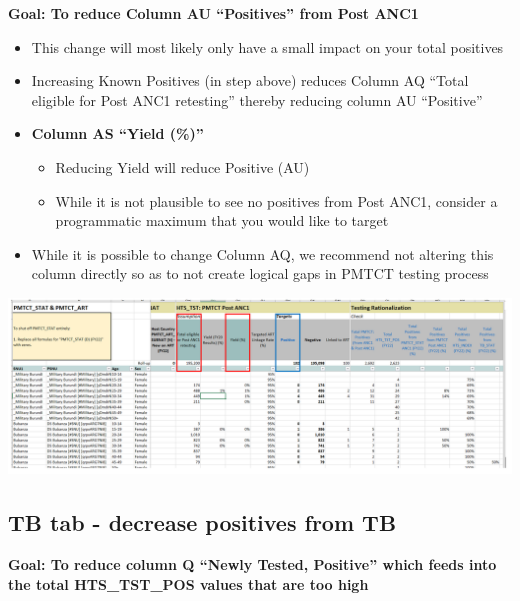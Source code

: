 \documentclass[
  openany]{book}
\providecommand{\tightlist}{%
  \setlength{\itemsep}{0pt}\setlength{\parskip}{0pt}}
\begin{document}
\textbf{Goal: To reduce Column AU ``Positives'' from Post ANC1}

\begin{itemize}
\item
  This change will most likely only have a small impact on your total positives
\item
  Increasing Known Positives (in step above) reduces Column AQ ``Total eligible for Post ANC1 retesting'' thereby reducing column AU ``Positive''
\item
  \textbf{Column AS ``Yield (\%)''}

  \begin{itemize}
  \tightlist
  \item
    Reducing Yield will reduce Positive (AU)
  \item
    While it is not plausible to see no positives from Post ANC1, consider a programmatic maximum that you would like to target
  \end{itemize}
\item
  While it is possible to change Column AQ, we recommend not altering this column directly so as to not create logical gaps in PMTCT testing process
\end{itemize}

\begin{center}

\includegraphics[width=7in]{./images/image17.png}

\end{center}

\hypertarget{tb-tab---decrease-positives-from-tb}{%
\subsection{TB tab - decrease positives from TB}\label{tb-tab---decrease-positives-from-tb}}

\textbf{Goal: To reduce column Q ``Newly Tested, Positive'' which feeds into the total HTS\_TST\_POS values that are too high}
\end{document}
